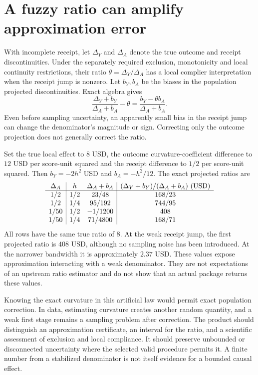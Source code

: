 \section{A fuzzy ratio can amplify approximation error}
\label{exec17:s4-fuzzy}

With incomplete receipt, let $\Delta_Y$ and $\Delta_A$ denote the true
outcome and receipt discontinuities. Under the separately required exclusion,
monotonicity and local continuity restrictions, their ratio
$\theta=\Delta_Y/\Delta_A$ has a local complier interpretation when the
receipt jump is nonzero. Let $b_Y,b_A$ be the biases in the population
projected discontinuities. Exact algebra gives
\begin{equation}
 \frac{\Delta_Y+b_Y}{\Delta_A+b_A}-\theta
       =\frac{b_Y-\theta b_A}{\Delta_A+b_A}.
 \label{exec17:s4-fuzzy-bias}
\end{equation}
Even before sampling uncertainty, an apparently small bias in the receipt
jump can change the denominator's magnitude or sign. Correcting only the
outcome projection does not generally correct the ratio.

Set the true local effect to $8$ USD, the outcome curvature-coefficient
difference to $12$ USD per score-unit squared and the receipt difference to
$1/2$ per score-unit squared. Then $b_Y=-2h^2$ USD and $b_A=-h^2/12$.
The exact projected ratios are
\[
\begin{array}{c|cc|c}
 \Delta_A&h&\Delta_A+b_A&
    (\Delta_Y+b_Y)/(\Delta_A+b_A)\ ({\rm USD})\\ \hline
 1/2&1/2&23/48&168/23\\
 1/2&1/4&95/192&744/95\\
 1/50&1/2&-1/1200&408\\
 1/50&1/4&71/4800&168/71
\end{array}
\]
All rows have the same true ratio of $8$. At the weak receipt jump, the
first projected ratio is $408$ USD, although no sampling noise has been
introduced. At the narrower bandwidth it is approximately $2.37$ USD.
These values expose approximation interacting with a weak denominator.
They are not expectations of an upstream ratio estimator and do not show
that an actual package returns these values.~\citep{exec17_s4_math}

Knowing the exact curvature in this artificial law would permit exact
population correction. In data, estimating curvature creates another random
quantity, and a weak first stage remains a sampling problem after correction.
The product should distinguish an approximation certificate, an interval for
the ratio, and a scientific assessment of exclusion and local compliance.
It should preserve unbounded or disconnected uncertainty where the selected
valid procedure permits it. A finite number from a stabilized denominator is
not itself evidence for a bounded causal effect.

